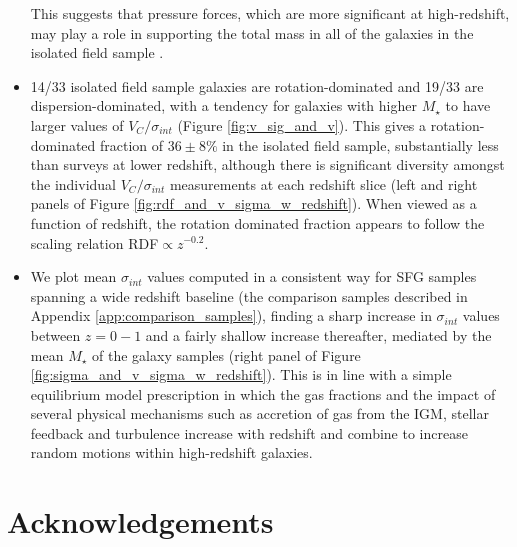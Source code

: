 \documentclass[fleqn,usenatbib]{mnras}
\begin{document}
\begin{itemize}
    This suggests that pressure forces, which are more significant at high-redshift, may play a role in supporting the total mass in all of the galaxies in the isolated field sample \citep[e.g.][]{Burkert2010}.  
    \item 14/33 isolated field sample galaxies are rotation-dominated and 19/33 are dispersion-dominated, with a tendency for galaxies with higher $M_{\star}$ to have larger values of $V_{C}/\sigma_{int}$ (Figure \ref{fig:v_sig_and_v}).
    This gives a rotation-dominated fraction of $36 \pm 8 \%$ in the isolated field sample, substantially less than surveys at lower redshift, although there is significant diversity amongst the individual $V_{C}/\sigma_{int}$ measurements at each redshift slice (left and right panels of Figure \ref{fig:rdf_and_v_sigma_w_redshift}).
    When viewed as a function of redshift, the rotation dominated fraction appears to follow the scaling relation RDF$\propto z^{-0.2}$.
    \item We plot mean $\sigma_{int}$ values computed in a consistent way for SFG samples spanning a wide redshift baseline (the comparison samples described in Appendix \ref{app:comparison_samples}), finding a sharp increase in $\sigma_{int}$ values between $z=0-1$ and a fairly shallow increase thereafter, mediated by the mean $M_{\star}$ of the galaxy samples (right panel of Figure \ref{fig:sigma_and_v_sigma_w_redshift}).
    This is in line with a simple equilibrium model prescription in which the gas fractions and the impact of several physical mechanisms such as accretion of gas from the IGM, stellar feedback and turbulence increase with redshift and combine to increase random motions within high-redshift galaxies.


\end{itemize}

\section*{Acknowledgements}
\end{document}
